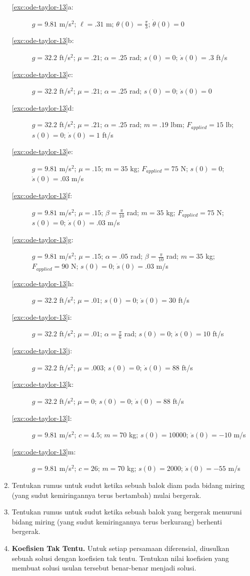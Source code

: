 \begin{enumerate}
\begin{description}
\item [{\ref{exc:ode-taylor-13}a:}] $g=9.81$ m/s$^{2}$; $\ell=.31$
m; $\theta(0)=\frac{\pi}{3}$; $\dot{\theta}(0)=0$  \hasananswer 
\item [{\ref{exc:ode-taylor-13}b:}] $g=32.2$ ft/s$^{2}$; $\mu=.21$;
$\alpha=.25$ rad; $s(0)=0$; $\dot{s}(0)=.3$ ft/s  \hasananswer 
\item [{\ref{exc:ode-taylor-13}c:}] $g=32.2$ ft/s$^{2}$; $\mu=.21$;
$\alpha=.25$ rad; $s(0)=0$; $\dot{s}(0)=0$  \hasasolution 
\item [{\ref{exc:ode-taylor-13}d:}] $g=32.2$ ft/s$^{2}$; $\mu=.21$;
$\alpha=.25$ rad; $m=.19$ lbm; $F_{applied}=15$ lb; $s(0)=0$;
$\dot{s}(0)=1$ ft/s
\item [{\ref{exc:ode-taylor-13}e:}] $g=9.81$ m/s$^{2}$; $\mu=.15$;
$m=35$ kg; $F_{applied}=75$ N; $s(0)=0$; $\dot{s}(0)=.03$ m/s
 \hasananswer 
\item [{\ref{exc:ode-taylor-13}f:}] $g=9.81$ m/s$^{2}$; $\mu=.15$;
$\beta=\frac{\pi}{10}$ rad; $m=35$ kg; $F_{applied}=75$ N; $s(0)=0$;
$\dot{s}(0)=.03$ m/s  \hasasolution 
\item [{\ref{exc:ode-taylor-13}g:}] $g=9.81$ m/s$^{2}$; $\mu=.15$;
$\alpha=.05$ rad; $\beta=\frac{\pi}{10}$ rad; $m=35$ kg; $F_{applied}=90$
N; $s(0)=0$; $\dot{s}(0)=.03$ m/s  \hasananswer 
\item [{\ref{exc:ode-taylor-13}h:}] $g=32.2$ ft/s$^{2}$; $\mu=.01$;
$s(0)=0$; $\dot{s}(0)=30$ ft/s  \hasananswer 
\item [{\ref{exc:ode-taylor-13}i:}] $g=32.2$ ft/s$^{2}$; $\mu=.01$;
$\alpha=\frac{\pi}{6}$ rad; $s(0)=0$; $\dot{s}(0)=10$ ft/s  \hasananswer 
\item [{\ref{exc:ode-taylor-13}j:}] $g=32.2$ ft/s$^{2}$; $\mu=.003$;
$s(0)=0$; $\dot{s}(0)=88$ ft/s  \hasananswer 
\item [{\ref{exc:ode-taylor-13}k:}] $g=32.2$ ft/s$^{2}$; $\mu=0$; $s(0)=0$;
$\dot{s}(0)=88$ ft/s
\item [{\ref{exc:ode-taylor-13}l:}] $g=9.81$ m/s$^{2}$; $c=4.5$; $m=70$
kg; $s(0)=10000$; $\dot{s}(0)=-10$ m/s  \hasananswer 
\item [{\ref{exc:ode-taylor-13}m:}] $g=9.81$ m/s$^{2}$; $c=26$; $m=70$
kg; $s(0)=2000$; $\dot{s}(0)=-55$ m/s  \hasasolution 
\end{description}
\item Tentukan rumus untuk sudut ketika sebuah balok diam pada bidang miring
(yang sudut kemiringannya terus bertambah) mulai bergerak.
\item Tentukan rumus untuk sudut ketika sebuah balok yang bergerak menuruni
bidang miring (yang sudut kemiringannya terus berkurang) berhenti
bergerak.
\item \textbf{Koefisien Tak Tentu.} Untuk setiap
persamaan diferensial, diusulkan sebuah solusi dengan koefisien tak
tentu. Tentukan nilai koefisien yang membuat solusi usulan tersebut
benar-benar menjadi solusi.


\end{enumerate}
